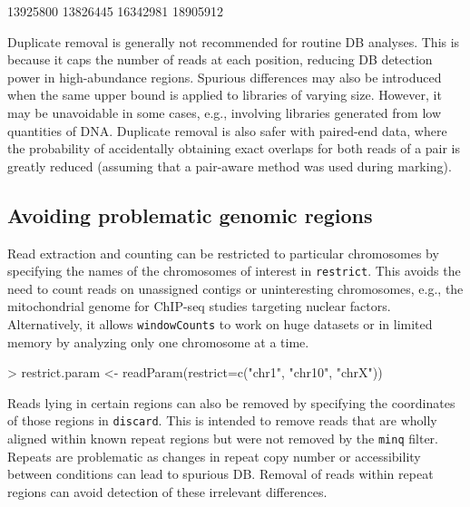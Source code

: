 \documentclass[12pt]{report}
\renewenvironment{Schunk}{\vspace{0pt}}{\vspace{0pt}}
\newcommand{\code}[1]{{\small\texttt{#1}}}
\begin{document}
\begin{Schunk}
\begin{Soutput}
[1] 13925800 13826445 16342981 18905912
\end{Soutput}
\end{Schunk}

Duplicate removal is generally not recommended for routine DB analyses. 
This is because it caps the number of reads at each position, reducing DB detection power in high-abundance regions. 
Spurious differences may also be introduced when the same upper bound is applied to libraries of varying size. 
However, it may be unavoidable in some cases, e.g., involving libraries generated from low quantities of DNA.
Duplicate removal is also safer with paired-end data, where the probability of accidentally obtaining exact overlaps for both reads of a pair is greatly reduced 
(assuming that a pair-aware method was used during marking).

\subsection{Avoiding problematic genomic regions}
Read extraction and counting can be restricted to particular chromosomes by specifying the names of the chromosomes of interest in \code{restrict}. 
This avoids the need to count reads on unassigned contigs or uninteresting chromosomes, e.g., the mitochondrial genome for ChIP-seq studies targeting nuclear factors. 
Alternatively, it allows \code{windowCounts} to work on huge datasets or in limited memory by analyzing only one chromosome at a time.

\begin{Schunk}
\begin{Sinput}
> restrict.param <- readParam(restrict=c("chr1", "chr10", "chrX"))
\end{Sinput}
\end{Schunk}

Reads lying in certain regions can also be removed by specifying the coordinates of those regions in \code{discard}. 
This is intended to remove reads that are wholly aligned within known repeat regions but were not removed by the \code{minq} filter. 
Repeats are problematic as changes in repeat copy number or accessibility between conditions can lead to spurious DB. 
Removal of reads within repeat regions can avoid detection of these irrelevant differences. 
\end{document}
